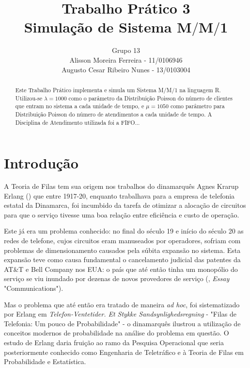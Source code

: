 \documentclass[a4paper,12pt,english,brazil]{article}
\begin{document}



\title{Trabalho Prático 3 \\ Simulação de Sistema M$/$M$/$1}
\author{Grupo 13 \\ Alisson Moreira Ferreira - 11/0106946 \\ Augusto Cesar Ribeiro Nunes - 13/0103004}
\maketitle
\begin{abstract}
Este Trabalho Prático implementa e simula um Sistema M$/$M$/$1 na linguagem R. Utilizou-se $\lambda = 1000$ como o parâmetro da Distribuição Poisson do número de clientes que entram no sistema a cada unidade de tempo, e $\mu = 1050$ como parâmetro para Distribuição Poisson do número de atendimentos a cada unidade de tempo. A Disciplina de Atendimento utilizada foi a FIFO...
\end{abstract}

\section{Introdução}
A Teoria de Filas tem sua origem nos trabalhos do dinamarquês Agnes Krarup Erlang (\cite{wiki:001}) que entre 1917-20, enquanto trabalhava para a empresa de telefonia estatal da Dinamarca, foi incumbido da tarefa de otimizar a alocação de circuitos para que o serviço tivesse uma boa relação entre eficiência e custo de operação.

Este já era um problema conhecido: no final do século 19 e início do século 20 as redes de telefone, cujos circuitos eram manuseados por operadores, sofriam com problemas de dimensionamento causados pela súbita expansão no sistema. Esta expansão teve como causa fundamental o cancelamento judicial das patentes da AT\&T e Bell Company nos EUA: o país que até então tinha um monopólio do serviço se viu inundado por dezenas de novos provedores de serviço (\cite{northrup2011american}, \textit{Essay} "Communications"). 

Mas o problema que até então era tratado de maneira \textit{ad hoc}, foi sistematizado por Erlang em \textit{Telefon-Ventetider. Et Stykke Sandsynlighedsregning} - "Filas de Telefonia: Um pouco de Probabilidade" - o dinamarquês ilustrou a utilização de conceitos modernos de probabilidade na análise do problema em questão. O estudo de Erlang daria fruição ao ramo da Pesquisa Operacional que seria posteriormente conhecido como Engenharia de Teletráfico e à Teoria de Filas em Probabilidade e Estatística. 
\end{document}
